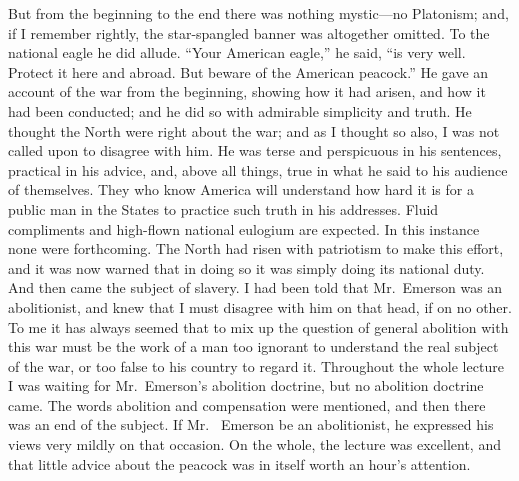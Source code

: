 But from the beginning to the end there was nothing mystic---no
Platonism; and, if I remember rightly, the star-spangled banner was
altogether omitted.  To the national eagle he did allude.  ``Your
American eagle,'' he said, ``is very well.  Protect it here and
abroad.  But beware of the American peacock.''  He gave an account
of the war from the beginning, showing how it had arisen, and how
it had been conducted; and he did so with admirable simplicity and
truth.  He thought the North were right about the war; and as I
thought so also, I was not called upon to disagree with him.  He
was terse and perspicuous in his sentences, practical in his
advice, and, above all things, true in what he said to his audience
of themselves.  They who know America will understand how hard it
is for a public man in the States to practice such truth in his
addresses.  Fluid compliments and high-flown national eulogium are
expected.  In this instance none were forthcoming.  The North had
risen with patriotism to make this effort, and it was now warned
that in doing so it was simply doing its national duty.  And then
came the subject of slavery.  I had been told that Mr.\ Emerson was
an abolitionist, and knew that I must disagree with him on that
head, if on no other.  To me it has always seemed that to mix up
the question of general abolition with this war must be the work of
a man too ignorant to understand the real subject of the war, or
too false to his country to regard it.  Throughout the whole
lecture I was waiting for Mr.\ Emerson's abolition doctrine, but no
abolition doctrine came.  The words abolition and compensation were
mentioned, and then there was an end of the subject.  If Mr.\ %
Emerson be an abolitionist, he expressed his views very mildly on
that occasion.  On the whole, the lecture was excellent, and that
little advice about the peacock was in itself worth an hour's
attention.

